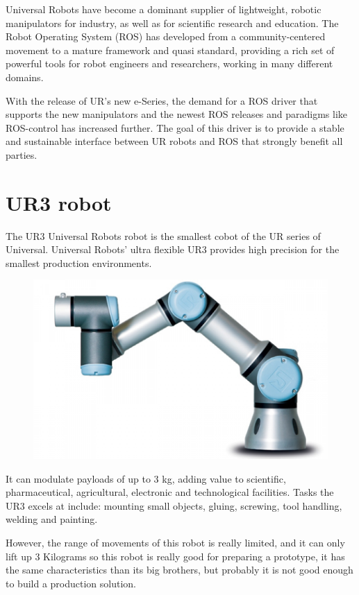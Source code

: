 	
		Universal Robots have become a dominant supplier of lightweight, robotic manipulators for industry, as well as for scientific research and education. The Robot Operating System (ROS) has developed from a community-centered movement to a mature framework and quasi standard, providing a rich set of powerful tools for robot engineers and researchers, working in many different domains.
		
		With the release of UR’s new e-Series, the demand for a ROS driver that supports the new manipulators and the newest ROS releases and paradigms like ROS-control has increased further. The goal of this driver is to provide a stable and sustainable interface between UR robots and ROS that strongly benefit all parties.
	
	
	\section{UR3 robot}
	
		The UR3 Universal Robots robot is the smallest cobot of the UR series of Universal. Universal Robots' ultra flexible UR3 provides high precision for the smallest production environments.
		
		\begin{figure}[h!]
			\centering
			\includegraphics[width=0.7\linewidth]{Images/logos/ur3}
			\label{fig:ur3}
		\end{figure}
	
		
		It can modulate payloads of up to 3 kg, adding value to scientific, pharmaceutical, agricultural, electronic and technological facilities. Tasks the UR3 excels at include: mounting small objects, gluing, screwing, tool handling, welding and painting.
		
		However, the range of movements of this robot is really limited, and it can only lift up 3 Kilograms so this robot is really good for preparing a prototype, it has the same characteristics than its big brothers, but probably it is not good enough to build a production solution.	
		
